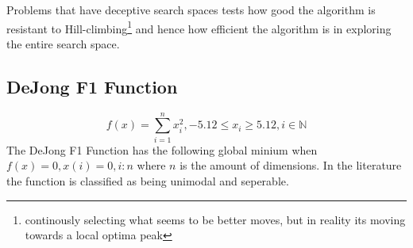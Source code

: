Problems that have deceptive search spaces tests how good the algorithm is resistant to Hill-climbing\footnote{continously selecting what seems to be better moves, but in reality its moving towards a local optima peak} and hence how efficient the algorithm is in exploring the entire search space\cite{evalevoalgo}.
\subsection{DeJong F1 Function}
\begin{equation}
\label{eq:DeJongF1}
	f(x) = \sum_{i=1}^n x^2_i, -5.12 \leq x_i \geq 5.12, i \in \mathbb{N}
\end{equation}
The DeJong F1 Function has the following global minium when $f(x) = 0, x(i) = 0, i:n$ where $n$ is the amount of dimensions\cite{numericalABC,ABCCompareStudy,ARPSO,PerfABC,ContinACSTS,TestFunctions}. In the literature the function is classified as being unimodal and seperable\cite{ABCCompareStudy,TestFunctions}. 
